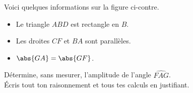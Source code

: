 %
%
\parbox [t]{.5\linewidth}{\vspace{0pt}
        Voici quelques informations sur la figure ci-contre.
    \begin{itemize}
        \item Le triangle $ABD$ est rectangle en $B$.
        \item Les droites $CF$ et $BA$ sont parallèles.
        \item $\abs{GA} = \abs{GF}$.
    \end{itemize}}
    \hfill
        

    Détermine, sans mesurer, l'amplitude de l'angle $\widehat{FAG}$.\\
    Écris tout ton raisonnement et tous tes calculs en justifiant.
